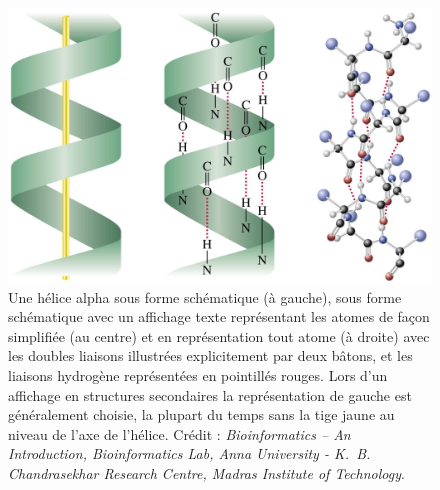 	\begin{figure}[H]
		\centering
		\includegraphics[width=\textwidth]{figures/ch1/aHelix}
		\caption[Hélices alpha, trois représentations différentes.]{Une hélice alpha sous forme schématique (à gauche), sous forme schématique avec un affichage texte représentant les atomes de façon simplifiée (au centre) et en représentation \og tout atome \fg{} (à droite) avec les doubles liaisons illustrées explicitement par deux bâtons, et les liaisons hydrogène représentées en pointillés rouges. Lors d'un affichage \og en structures secondaires \fg{} la représentation de gauche est généralement choisie, la plupart du temps sans la tige jaune au niveau de l'axe de l'hélice. Crédit : \emph{\emph{Bioinformatics -- An Introduction}, Bioinformatics Lab, Anna University - K.~B. Chandrasekhar Research Centre, Madras Institute of Technology}\footnotemark.}
		\label{fig:aHelix}
	\end{figure}
	
		
